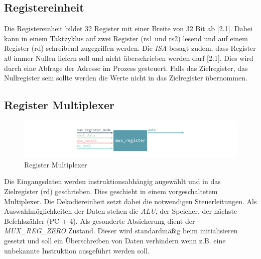         \subsection{Registereinheit} 
            Die Registereinheit bildet 32 Register mit einer Breite von 32 Bit ab \cite{riscv-isa-specs}[2.1].
            Dabei kann in einem Taktzyklus auf zwei Register (rs1 und rs2) lesend und auf einem Register (rd) schreibend zugegriffen werden.
            Die \textit{ISA} besagt zudem, dass Register x0 immer Nullen liefern soll und nicht überschrieben werden darf \cite{riscv-isa-specs}[2.1].
            Dies wird durch eine Abfrage der Adresse im Prozess gesteuert. Falls das Zielregister, das Nullregister sein sollte werden die Werte
            nicht in das Zielregister übernommen.
            

        \subsection{Register Multiplexer}

            \begin{figure}[H]
                \centering
                \includegraphics[scale=1]{img/block_mux_register.pdf}
                \caption{Register Multiplexer}
                \label{fig:register_mux}
            \end{figure}


            Die Eingangsdaten werden instruktionsabhängig augewählt und in das Zielregister (rd) geschrieben.
            Dies geschieht in einem vorgeschaltetem Multiplexer. Die Dekodiereinheit setzt dabei die notwendigen Steuerleitungen.
            Als Auswahlmöglichkeiten der Daten stehen die \textit{ALU}, der Speicher, der nächste Befehlszähler (PC + 4).
            Als gesonderte Absicherung dient der \textit{MUX\_REG\_ZERO} Zustand.
            Dieser wird standardmäßig beim initialisieren gesetzt und soll ein Überschreiben von Daten verhindern wenn z.B.
            eine unbekannte Instruktion ausgeführt werden soll.
            

